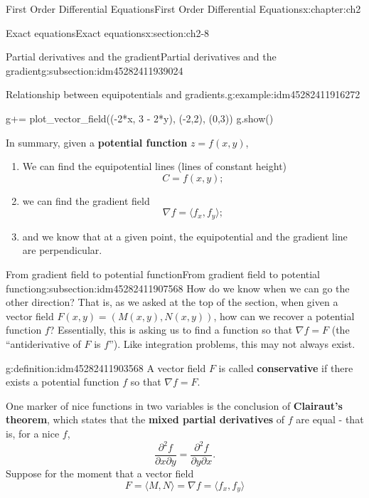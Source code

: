 \documentclass[oneside,10pt,]{book}
\newcommand{\terminology}[1]{\textbf{#1}}
\numberwithin{equation}{section}
\numberwithin{equation}{section}
\begin{document}
\begin{chapterptx}{First Order Differential Equations}{}{First Order Differential Equations}{}{}{x:chapter:ch2}
\begin{sectionptx}{Exact equations}{}{Exact equations}{}{}{x:section:ch2-8}
\begin{subsectionptx}{Partial derivatives and the gradient}{}{Partial derivatives and the gradient}{}{}{g:subsection:idm45282411939024}
\begin{example}{Relationship between equipotentials and gradients.}{g:example:idm45282411916272}
\begin{sageinput}
g+= plot_vector_field((-2*x, 3 - 2*y), (-2,2), (0,3))
g.show()
\end{sageinput}
\end{example}
In summary, given a \terminology{potential function} \(z = f(x,y)\),%
\begin{enumerate}
\item{}We can find the equipotential lines (lines of constant height)%
\begin{equation*}
C = f(x,y);
\end{equation*}
%
\item{}we can find the gradient field%
\begin{equation*}
\nabla f = \langle f_x, f_y \rangle;
\end{equation*}
%
\item{}and we know that at a given point, the equipotential and the gradient line are perpendicular.%
\end{enumerate}
%
\end{subsectionptx}
%
%
\typeout{************************************************}
\typeout{************************************************}
%
\begin{subsectionptx}{From gradient field to potential function}{}{From gradient field to potential function}{}{}{g:subsection:idm45282411907568}
How do we know when we can go the other direction? That is, as we asked at the top of the section, when given a vector field \(F(x,y) = (M(x,y), N(x,y))\), how can we recover a potential function \(f\)? Essentially, this is asking us to find a function so that \(\nabla f = F\) (the ``antiderivative of \(F\) is \(f\)''). Like integration problems, this may not always exist.%
\begin{definition}{}{g:definition:idm45282411903568}%
A vector field \(F\) is called \terminology{conservative} if there exists a potential function \(f\) so that \(\nabla f = F\).%
\end{definition}
One marker of nice functions in two variables is the conclusion of \terminology{Clairaut's theorem}, which states that the \terminology{mixed partial derivatives} of \(f\) are equal - that is, for a nice \(f\),%
\begin{equation*}
\frac{\partial^2 f}{\partial x \partial y} = \frac{\partial^2 f}{\partial y \partial x}.
\end{equation*}
Suppose for the moment that a vector field%
\begin{equation*}
F = \langle M, N \rangle = \nabla f = \langle f_x, f_y \rangle

\end{equation*}
\end{subsectionptx}
\end{sectionptx}
\end{chapterptx}
\end{document}

